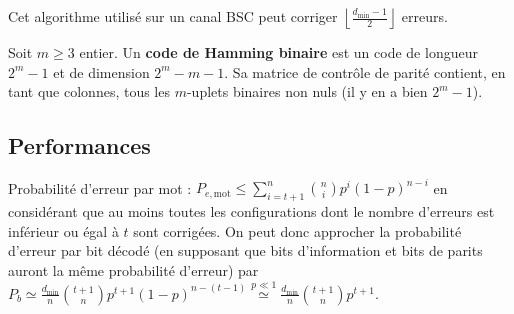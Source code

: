 		Cet algorithme utilisé sur un canal BSC peut corriger $\left\lfloor \frac{d_{\min} - 1}{2} \right\rfloor$ erreurs.

	\begin{defn}
		Soit $m \geq 3$ entier.
		Un \textbf{code de Hamming binaire} est un code de longueur $2^m - 1$ et de dimension $2^m - m - 1$.
		Sa matrice de contrôle de parité contient, en tant que colonnes, tous les $m$-uplets binaires non nuls (il y en a bien $2^m - 1$).
	\end{defn}

\subsection{Performances}

	Probabilité d'erreur par mot : $P_{e,\text{mot}} \leq \sum_{i = t + 1}^n \binom{n}{i} p^i (1 - p)^{n - i}$ en considérant que au moins toutes les configurations dont le nombre d'erreurs est inférieur ou égal à $t$ sont corrigées.
	On peut donc approcher la probabilité d'erreur par bit décodé (en supposant que bits d'information et bits de parits auront la même probabilité d'erreur) par $P_b \simeq \frac{d_{\min}}{n} \binom{t + 1}{n} p^{t + 1} (1 - p)^{n - (t - 1)} \overset{p \ll 1}{\simeq} \frac{d_{\min}}{n} \binom{t + 1}{n} p^{t + 1}$.
